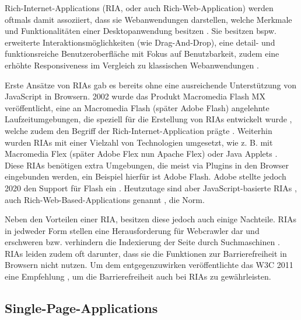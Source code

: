 
Rich-Internet-Applications (RIA, oder auch Rich-Web-Application) werden oftmals damit assoziiert, dass sie Webanwendungen darstellen, welche Merkmale und Funktionalitäten einer Desktopanwendung besitzen \cite{TenYearsOfRIAs} \cite{NecessityOfMethodologiesToModelRIAs}. Sie besitzen bspw. erweiterte Interaktionsmöglichkeiten (wie Drag-And-Drop), eine detail- und funktionsreiche Benutzeroberfläche mit Fokus auf Benutzbarkeit, zudem eine erhöhte Responsiveness im Vergleich zu klassischen Webanwendungen \cite{TenYearsOfRIAs}.

Erste Ansätze von RIAs gab es bereits ohne eine ausreichende Unterstützung von Java\-Script in Browsern. 2002 wurde das Produkt Macromedia Flash MX veröffentlicht, eine an Macromedia Flash (später Adobe Flash) angelehnte Laufzeitumgebungen, die speziell für die Erstellung von RIAs entwickelt wurde \cite{MacromediaFlashMXWhitePaper}, welche zudem den Begriff der Rich-Internet-Application prägte \cite{TenYearsOfRIAs}. Weiterhin wurden RIAs mit einer Vielzahl von Technologien umgesetzt, wie z. B. mit Macromedia Flex (später Adobe Flex nun Apache Flex) oder Java Applets \cite{NecessityOfMethodologiesToModelRIAs} \cite{RIAsTheNextStageOfApplicationDevelopment} \cite{RichInternetApplications} \cite{FinkIntroducingSPAs}. Diese RIAs benötigen extra Umgebungen, die meist via Plugins in den Browser eingebunden werden, ein Beispiel hierfür ist Adobe Flash. Adobe stellte jedoch 2020 den Support für Flash ein \cite{Netlytic}. Heutzutage sind aber JavaScript-basierte RIAs \cite{RIAsTheNextStageOfApplicationDevelopment}, auch Rich-Web-Based-Applications genannt \cite{RichWebBasedApplications} \cite{Netlytic}, die Norm. 

Neben den Vorteilen einer RIA, besitzen diese jedoch auch einige Nachteile. RIAs in jedweder Form stellen eine Herausforderung für Webcrawler dar und erschweren bzw. verhindern die Indexierung der Seite durch Suchmaschinen \cite{CrawlingRIAs}. RIAs leiden zudem oft darunter, dass sie die Funktionen zur Barrierefreiheit in Browsern nicht nutzen. Um dem entgegenzuwirken veröffentlichte das W3C 2011 eine Empfehlung \cite{W3CAccessibleRIAs}, um die Barrierefreiheit auch bei RIAs zu gewährleisten.

\subsection{Single-Page-Applications}
\label{sec:single-page-applications}


